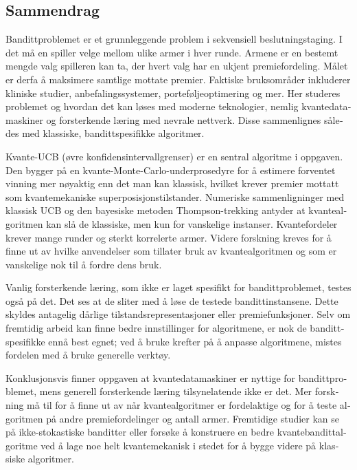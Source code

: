 \begin{otherlanguage}{norsk}

    \chapter{Sammendrag}
    Bandittproblemet er et grunnleggende problem i sekvensiell beslutningstaging.
    I det må en spiller velge mellom ulike armer i hver runde.
    Armene er en bestemt mengde valg spilleren kan ta, der hvert valg har en ukjent premiefordeling.
    Målet er derfa å maksimere samtlige mottate premier.
    Faktiske bruksområder inkluderer kliniske studier, anbefalingssystemer, porteføljeoptimering og mer.
    Her studeres problemet og hvordan det kan løses med moderne teknologier, nemlig kvantedatamaskiner og forsterkende læring med nevrale nettverk.
    Disse sammenlignes således med klassiske, bandittspesifikke algoritmer.

    Kvante-UCB (øvre konfidensintervallgrenser) er en sentral algoritme i oppgaven.
    Den bygger på en kvante-Monte-Carlo-underprosedyre for å estimere forventet vinning mer nøyaktig enn det man kan klassisk, hvilket krever premier mottatt som kvantemekaniske superposisjonstilstander.
    Numeriske sammenligninger med klassisk UCB og den bayesiske metoden Thompson-trekking antyder at kvantealgoritmen kan slå de klassiske, men kun  for vanskelige instanser.
    Kvantefordeler krever mange runder og sterkt korrelerte armer.
    Videre forskning kreves for å finne ut av hvilke anvendelser som tillater bruk av kvantealgoritmen og som er vanskelige nok til å fordre dens bruk.

    Vanlig forsterkende læring, som ikke er laget spesifikt for bandittproblemet, testes også på det.
    Det ses at de sliter med å løse de testede bandittinstansene.
    Dette skyldes antagelig dårlige tilstandsrepresentasjoner eller premiefunksjoner.
    Selv om fremtidig arbeid kan finne bedre innstillinger for algoritmene, er nok de bandittspesifikke ennå best egnet; ved å bruke krefter på å anpasse algoritmene, mistes fordelen med å bruke generelle verktøy.

    Konklusjonsvis finner oppgaven at kvantedatamaskiner er nyttige for bandittproblemet, mens generell forsterkende læring tilsynelatende ikke er det.
    Mer forskning må til for å finne ut av når kvantealgoritmer er fordelaktige og for å teste algoritmen på andre premiefordelinger og antall armer.
    Fremtidige studier kan se på ikke-stokastiske banditter eller forsøke å konstruere en bedre kvantebandittalgoritme ved å lage noe helt kvantemekanisk i stedet for å bygge videre på klassiske algoritmer.

\end{otherlanguage}

\cleardoublepage